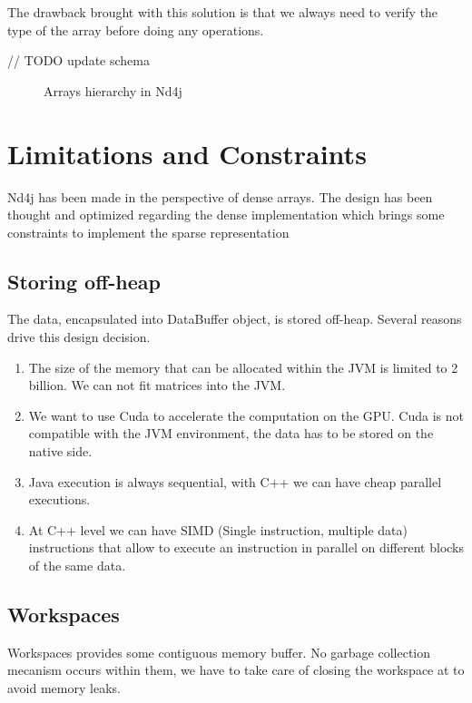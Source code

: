 The drawback brought with this solution is that we always need to verify the type of the array before doing any operations.

// TODO update schema
 
\begin{figure}[H]
	\begin{center}
		\label{fig:hierarchy}
		\caption{Arrays hierarchy in Nd4j}
	\end{center}
\end{figure}


\section{Limitations and Constraints}

Nd4j has been made in the perspective of dense arrays. The design has been thought and optimized regarding the dense implementation which brings some constraints to implement the sparse representation
\subsection{Storing off-heap}

The data, encapsulated into DataBuffer object, is stored off-heap. Several reasons drive this design decision.
\begin{enumerate}
	\item The size of the memory that can be allocated within the JVM is limited to 2 billion. We can not fit matrices into the JVM.
	\item We want to use Cuda to accelerate the computation on the GPU. Cuda is not compatible with the JVM environment, the data has to be stored on the native side.
	\item Java execution is always sequential, with C++ we can have cheap parallel executions.
	\item At C++ level we can have SIMD (Single instruction, multiple data) instructions that allow to execute an instruction in parallel on different blocks of the same data.
\end{enumerate}

\subsection{Workspaces}

Workspaces provides some contiguous memory buffer. No garbage collection mecanism occurs within them, we have to take care of closing the workspace at to avoid memory leaks. 

